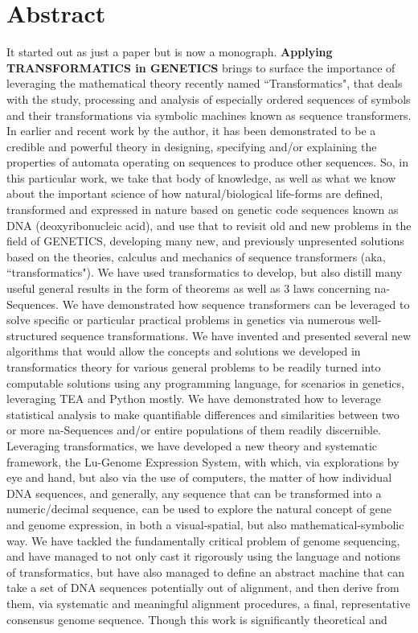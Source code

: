 \documentclass[a4paper, 18pt]{book} %
\begin{document}

\mainmatter

\chapter*{Abstract}
\large

It started out as just a paper but is now a monograph. \textbf{Applying TRANSFORMATICS in GENETICS} brings to surface the importance of leveraging the mathematical theory recently named ``Transformatics", that deals with the study, processing and analysis of especially ordered sequences of symbols and their transformations via symbolic machines known as sequence transformers. In earlier and recent work by the author, it has been demonstrated to be a credible and powerful theory in designing, specifying and/or explaining the properties of automata operating on sequences to produce other sequences. So, in this particular work, we take that body of knowledge, as well as what we know about the important science of how natural/biological life-forms are defined, transformed and expressed in nature based on genetic code sequences known as DNA (deoxyribonucleic acid), and use that to revisit old and new problems in the field of GENETICS, developing many new, and previously unpresented solutions based on the theories, calculus and mechanics of sequence transformers (aka, ``transformatics"). We have used transformatics to develop, but also distill many useful general results in the form of theorems as well as 3 laws concerning na-Sequences. We have demonstrated how sequence transformers can be leveraged to solve specific or particular practical problems in genetics via numerous well-structured sequence transformations. We have invented and presented several new algorithms that would allow the concepts and solutions we developed in transformatics theory for various general problems to be readily turned into computable solutions using any programming language, for scenarios in genetics, leveraging TEA and Python mostly. We have demonstrated how to leverage statistical analysis to make quantifiable differences and similarities between two or more na-Sequences and/or entire populations of them readily discernible. Leveraging transformatics, we have developed a new theory and systematic framework, the Lu-Genome Expression System, with which, via explorations by eye and hand, but also via the use of computers, the matter of how individual DNA sequences, and generally, any sequence that can be transformed into a numeric/decimal sequence, can be used to explore the natural concept of gene and genome expression, in both a visual-spatial, but also mathematical-symbolic way. We have tackled the fundamentally critical problem of genome sequencing, and have managed to not only cast it rigorously using the language and notions of transformatics, but have also managed to define an abstract machine that can take a set of DNA sequences potentially out of alignment, and then derive from them, via systematic and meaningful alignment procedures, a final, representative consensus genome sequence. Though this work is significantly theoretical and 
\end{document}
